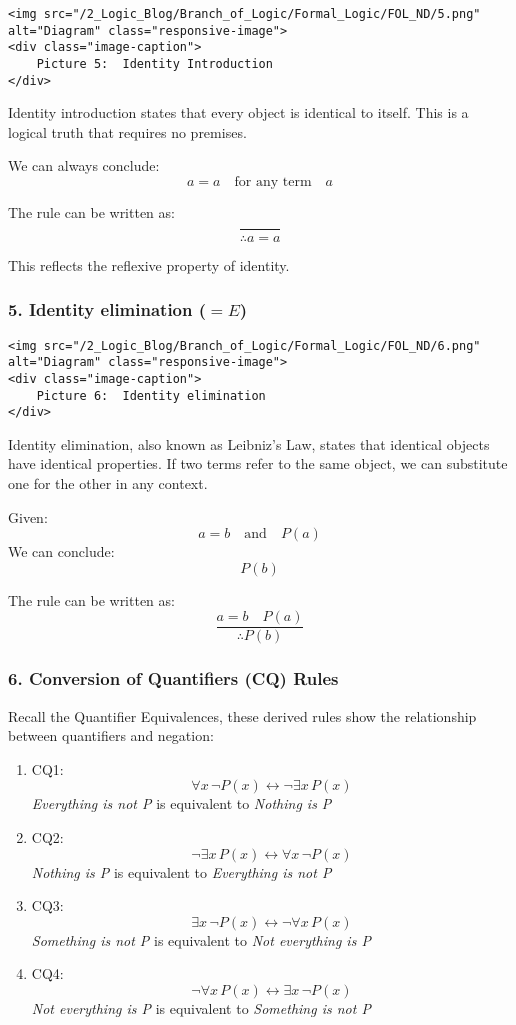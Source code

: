 \begin{verbatim}
<img src="/2_Logic_Blog/Branch_of_Logic/Formal_Logic/FOL_ND/5.png" alt="Diagram" class="responsive-image">
<div class="image-caption">
    Picture 5:  Identity Introduction
</div>
\end{verbatim}

Identity introduction states that every object is identical to itself.
This is a logical truth that requires no premises.

We can always conclude: \[a = a \quad \text{for any term} \quad a\]

The rule can be written as: \[\frac{}{\therefore a = a}\]

This reflects the reflexive property of identity.

\subsubsection{\texorpdfstring{5. Identity elimination
(\(=E\))}{5. Identity elimination (=E)}}\label{identity-elimination-e}

\begin{verbatim}
<img src="/2_Logic_Blog/Branch_of_Logic/Formal_Logic/FOL_ND/6.png" alt="Diagram" class="responsive-image">
<div class="image-caption">
    Picture 6:  Identity elimination
</div>
\end{verbatim}

Identity elimination, also known as Leibniz's Law, states that identical
objects have identical properties. If two terms refer to the same
object, we can substitute one for the other in any context.

Given: \[a = b \quad \text{and} \quad P(a)\] We can conclude: \[P(b)\]

The rule can be written as: \[\frac{a = b \quad P(a)}{\therefore P(b)}\]

\subsubsection{6. Conversion of Quantifiers (CQ)
Rules}\label{conversion-of-quantifiers-cq-rules}

Recall the Quantifier Equivalences, these derived rules show the
relationship between quantifiers and negation:

\begin{enumerate}
\def\labelenumi{\arabic{enumi}.}
\item
  CQ1: \[\forall x\, \neg P(x) \leftrightarrow \neg \exists x\, P(x)\]
  \emph{Everything is not P} is equivalent to \emph{Nothing is P}
\item
  CQ2: \[\neg \exists x\, P(x) \leftrightarrow \forall x\, \neg P(x)\]
  \emph{Nothing is P} is equivalent to \emph{Everything is not P}
\item
  CQ3: \[\exists x\, \neg P(x) \leftrightarrow \neg \forall x\, P(x)\]
  \emph{Something is not P} is equivalent to \emph{Not everything is P}
\item
  CQ4: \[\neg \forall x\, P(x) \leftrightarrow \exists x\, \neg P(x)\]
  \emph{Not everything is P} is equivalent to \emph{Something is not P}
\end{enumerate}
